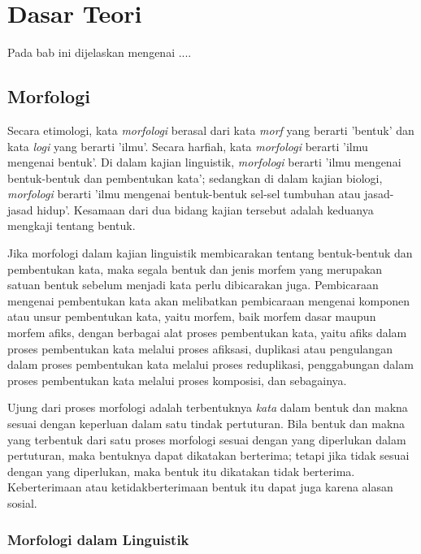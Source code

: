 \chapter{Dasar Teori}
\label{chap:dasarTeori}

Pada bab ini dijelaskan mengenai ....

\section{Morfologi}
\label{sec:morfologi}

Secara etimologi, kata \textit{morfologi} berasal dari kata \textit{morf} yang berarti 'bentuk' dan kata \textit{logi} yang berarti 'ilmu'\cite{chaer:08:morfologi}. Secara harfiah, kata \textit{morfologi} berarti 'ilmu mengenai bentuk'. Di dalam kajian linguistik, \textit{morfologi} berarti 'ilmu mengenai bentuk-bentuk dan pembentukan kata'; sedangkan di dalam kajian biologi, \textit{morfologi} berarti 'ilmu mengenai bentuk-bentuk sel-sel tumbuhan atau jasad-jasad hidup'. Kesamaan dari dua bidang kajian tersebut adalah keduanya mengkaji tentang bentuk. 

Jika morfologi dalam kajian linguistik membicarakan tentang bentuk-bentuk dan pembentukan kata, maka segala bentuk dan jenis morfem yang merupakan satuan bentuk sebelum menjadi kata perlu dibicarakan juga. Pembicaraan mengenai pembentukan kata akan melibatkan pembicaraan mengenai komponen atau unsur pembentukan kata, yaitu morfem, baik morfem dasar maupun morfem afiks, dengan berbagai alat proses pembentukan kata, yaitu afiks dalam proses pembentukan kata melalui proses afiksasi, duplikasi atau pengulangan dalam proses pembentukan kata melalui proses reduplikasi, penggabungan dalam proses pembentukan kata melalui proses komposisi, dan sebagainya. 

Ujung dari proses morfologi adalah terbentuknya \textit{kata} dalam bentuk dan makna sesuai dengan keperluan dalam satu tindak pertuturan. Bila bentuk dan makna yang terbentuk dari satu proses morfologi sesuai dengan yang diperlukan dalam pertuturan, maka bentuknya dapat dikatakan berterima; tetapi jika tidak sesuai dengan yang diperlukan, maka bentuk itu dikatakan tidak berterima. Keberterimaan atau ketidakberterimaan bentuk itu dapat juga karena alasan sosial.


\subsection{Morfologi dalam Linguistik}
\label{sec:morfologiLinguistik}


